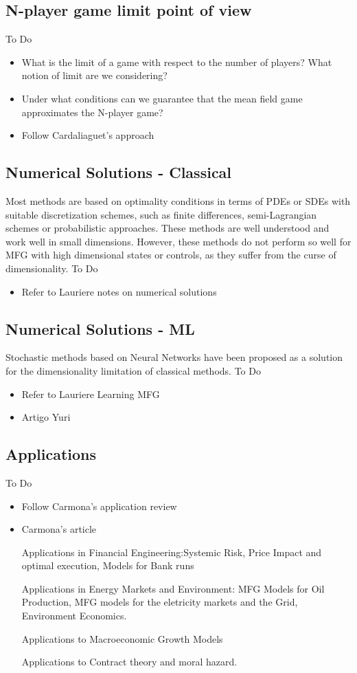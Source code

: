 \documentclass{article}
\begin{document}
\subsection{N-player game limit point of view}
To Do
\begin{itemize}
    \item What is the limit of a game with respect to the number of players? What notion of limit are we considering?
    \item Under what conditions can we guarantee that the mean field game approximates the N-player game?
    \item Follow Cardaliaguet's approach
\end{itemize}



\subsection{Numerical Solutions - Classical}


Most methods are based on optimality conditions in terms of PDEs or SDEs with suitable discretization schemes, such as finite differences, semi-Lagrangian schemes or probabilistic approaches. These methods are well understood and work well in small dimensions. However, these methods do not perform so well for MFG with high dimensional states or controls, as they suffer from the curse of dimensionality.
To Do
\begin{itemize}
    \item Refer to Lauriere notes on numerical solutions
\end{itemize}

\subsection{Numerical Solutions - ML}
Stochastic methods based on Neural Networks have been proposed as a solution for the dimensionality limitation of classical methods.
To Do
\begin{itemize}
    \item Refer to Lauriere Learning MFG
    \item Artigo Yuri
\end{itemize}

\subsection{Applications}
To Do
\begin{itemize}
    \item Follow Carmona's application review
    \item Carmona's article 
    
    Applications in Financial Engineering:Systemic Risk, Price Impact and optimal execution, Models for Bank runs
    
    Applications in Energy Markets and Environment: MFG Models for Oil Production, MFG models for the eletricity markets and the Grid, Environment Economics.

    Applications to Macroeconomic Growth Models

    Applications to Contract theory and moral hazard.
\end{itemize}
\end{document}
